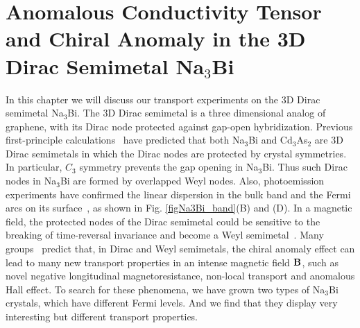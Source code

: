 
\chapter{Anomalous Conductivity Tensor and Chiral Anomaly in the 3D Dirac Semimetal Na$_3$Bi\label{ch:na3bi}}


In this chapter we will discuss our transport experiments on the 3D Dirac semimetal Na$_3$Bi. The 3D Dirac semimetal is a three dimensional analog of graphene, with its Dirac node protected against gap-open hybridization. Previous first-principle calculations~\cite{Wang2012} have predicted that both Na$_3$Bi and Cd$_3$As$_2$ are 3D Dirac semimetals in which the Dirac nodes are protected by crystal symmetries. In particular, $C_3$ symmetry prevents the gap opening in Na$_3$Bi. Thus such Dirac nodes in Na$_3$Bi are formed by overlapped Weyl nodes. Also, photoemission experiments have confirmed the linear dispersion in the bulk band and the Fermi arcs on its surface~\cite{Liu2014a, Xu2015, Xu2013}, as shown in Fig. \ref{figNa3Bi_band}(B) and (D). In a magnetic field, the protected nodes of the Dirac semimetal could be sensitive to the breaking of time-reversal invariance and become a Weyl semimetal~\cite{Wang2012}. Many groups~\cite{Son2013,Burkov2011,Hosur2013,Parameswaran2014} predict that, in Dirac and Weyl semimetals, the chiral anomaly effect can lead to many new transport properties in an intense magnetic field $\bf B$, such as novel negative longitudinal magnetoresistance, non-local transport and anomalous Hall effect. To search for these phenomena, we have grown two types of Na$_3$Bi crystals, which have different Fermi levels. And we find that they display very interesting but different transport properties. 

